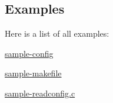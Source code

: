 \subsection{Examples}
Here is a list of all examples:\begin{DoxyCompactItemize}
\item 
\hyperlink{sample-config-example}{sample-\/config}
\item 
\hyperlink{sample-makefile-example}{sample-\/makefile}
\item 
\hyperlink{sample-readconfig_8c-example}{sample-\/readconfig.c}
\end{DoxyCompactItemize}
